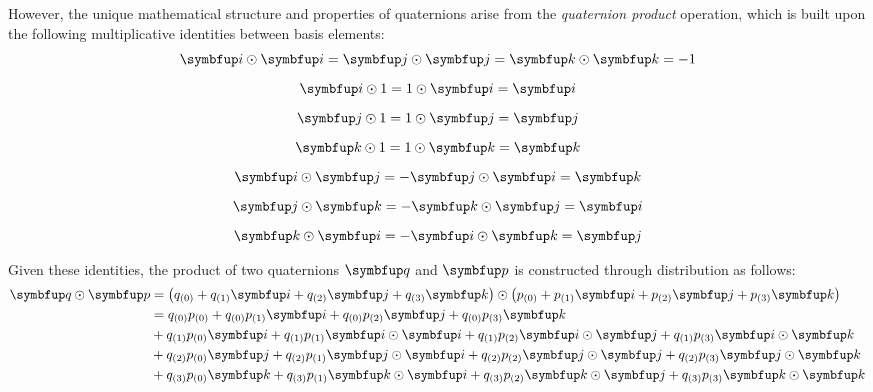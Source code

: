However, the unique mathematical structure and properties of quaternions arise from the \emph{quaternion product} operation, which is built upon the following multiplicative identities between basis elements:
\begin{equation} \label{E:Quat:Def:BasisMult}
\begin{gathered}
\qi \qprod \qi = \qj \qprod \qj = \qk \qprod \qk =-1 \\[6pt]
\qi \qprod 1 = 1 \qprod \qi = \qi \\[6pt]
\qj \qprod 1 = 1 \qprod \qj = \qj \\[6pt]
\qk \qprod 1 = 1 \qprod \qk = \qk \\[6pt]
\qi \qprod \qj = -\qj \qprod \qi = \qk \\[6pt]
\qj \qprod \qk = -\qk \qprod \qj = \qi \\[6pt]
\qk \qprod \qi = -\qi \qprod \qk = \qj
\end{gathered}
\end{equation}

Given these identities, the product of two quaternions $\quat{q}$ and $\quat{p}$ is constructed through distribution as follows:
\begin{equation} \label{E:Quat:Der:QuatProdBasis}
\begin{aligned}
\quat{q}\qprod\quat{p} &= \left( \qcmp{q}{0} + \qcmp{q}{1} \qi + \qcmp{q}{2} \qj + \qcmp{q}{3} \qk \right) \qprod \left( \qcmp{p}{0} + \qcmp{p}{1} \qi + \qcmp{p}{2} \qj + \qcmp{p}{3} \qk \right) \\
&= \qcmp{q}{0} \qcmp{p}{0} + \qcmp{q}{0} \qcmp{p}{1} \qi + \qcmp{q}{0} \qcmp{p}{2} \qj + \qcmp{q}{0} \qcmp{p}{3} \qk \\
&+ \qcmp{q}{1} \qcmp{p}{0} \qi + \qcmp{q}{1} \qcmp{p}{1} \qi \qprod \qi  + \qcmp{q}{1} \qcmp{p}{2} \qi \qprod \qj + \qcmp{q}{1} \qcmp{p}{3} \qi \qprod \qk \\
&+ \qcmp{q}{2} \qcmp{p}{0} \qj + \qcmp{q}{2} \qcmp{p}{1} \qj \qprod \qi + \qcmp{q}{2} \qcmp{p}{2} \qj \qprod \qj + \qcmp{q}{2} \qcmp{p}{3} \qj \qprod \qk \\
&+ \qcmp{q}{3} \qcmp{p}{0} \qk + \qcmp{q}{3} \qcmp{p}{1} \qk \qprod \qi + \qcmp{q}{3} \qcmp{p}{2} \qk \qprod \qj + \qcmp{q}{3} \qcmp{p}{3} \qk \qprod \qk
\end{aligned}
\end{equation}

